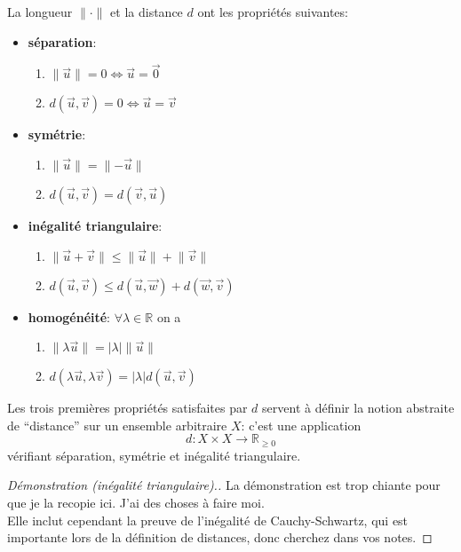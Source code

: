 \documentclass{book}
\numberwithin{equation}{section}
\providecommand{\origin}{{\vec 0}}
\providecommand{\longueur}[1]{{\lVert#1\rVert}}
\providecommand{\abs}[1]{{\lvert#1\rvert}}
\begin{document}
\begin{prop}
	La longueur $\longueur{\cdot}$ et la distance $d$ ont les propriétés suivantes:
	\begin{itemize}
		\item \textbf{séparation}:
			\begin{enumerate}
				\item $\longueur{\vec u} = 0 \iff \vec u = \origin$
				\item $d(\vec u, \vec v) = 0 \iff \vec u = \vec v$
			\end{enumerate}
		\item \textbf{symétrie}:
			\begin{enumerate}
				\item $\longueur{\vec u} = \longueur{-\vec u}$
				\item $d(\vec u, \vec v) = d(\vec v, \vec u)$
			\end{enumerate}
		\item \textbf{inégalité triangulaire}: 
			\begin{enumerate}
				\item $\longueur{\vec u + \vec v} \leq \longueur{\vec u} + \longueur{\vec v}$
				\item $d(\vec u, \vec v) \leq d(\vec u, \vec w) + d(\vec w, \vec v)$
			\end{enumerate}
		\item \textbf{homogénéité}: $\forall \lambda \in \mathbb R$ on a
			\begin{enumerate}
				\item $\longueur{\lambda \vec u} = \abs{\lambda}\longueur{\vec u}$
				\item $d(\lambda \vec u, \lambda \vec v) = \abs{\lambda}d(\vec u, \vec v)$
			\end{enumerate}
	\end{itemize}
\end{prop}
Les trois premières propriétés satisfaites par $d$ servent à définir la notion abstraite de ``distance'' sur un ensemble arbitraire $X$: c'est une application
	\begin{equation*}
		d: X \times X \to \mathbb R_{\geq 0}
	\end{equation*}
	vérifiant séparation, symétrie et inégalité triangulaire.

\begin{proof}[Démonstration (inégalité triangulaire).]
	La démonstration est trop chiante pour que je la recopie ici. J'ai des choses à faire moi.\\
	Elle inclut cependant la preuve de l'inégalité de Cauchy-Schwartz, qui est importante lors de la définition de distances, donc cherchez dans vos notes.
\end{proof}
\end{document}
